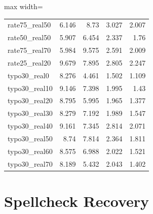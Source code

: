 \documentclass[11pt]{article}
\begin{document}
\begin{table}[H]
\begin{adjustbox}{max width=\textwidth}
\begin{tabular}{lrrrr}
rate75\_real50 & 6.146 & 8.73 & 3.027 & 2.007 \\
rate50\_real50 & 5.907 & 6.454 & 2.337 & 1.76 \\
rate75\_real70 & 5.984 & 9.575 & 2.591 & 2.009 \\
rate25\_real20 & 9.679 & 7.895 & 2.805 & 2.247 \\
typo30\_real0 & 8.276 & 4.461 & 1.502 & 1.109 \\
typo30\_real10 & 9.146 & 7.398 & 1.995 & 1.43 \\
typo30\_real20 & 8.795 & 5.995 & 1.965 & 1.377 \\
typo30\_real30 & 8.279 & 7.192 & 1.989 & 1.547 \\
typo30\_real40 & 9.161 & 7.345 & 2.814 & 2.071 \\
typo30\_real50 & 8.74 & 7.814 & 2.364 & 1.811 \\
typo30\_real60 & 8.575 & 6.988 & 2.022 & 1.521 \\
typo30\_real70 & 8.189 & 5.432 & 2.043 & 1.402 \\
\bottomrule
\end{tabular}
\end{adjustbox}
\end{table}

\section*{Spellcheck Recovery}

\end{document}
